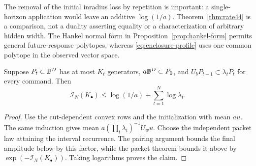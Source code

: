 The removal of the initial inradius loss by repetition is important:
a single-horizon application would leave an additive $\log(1/a)$.
Theorem~\ref{thm:rate44} is a comparison, not a duality asserting equality
or a characterization of arbitrary hidden width. The Hankel normal
form in Proposition~\ref{prop:hankel-form} permits general future-response
polytopes, whereas \eqref{eq:enclosure-profile} uses one common polytope
in the observed vector space.

\begin{corollary}\label{cor:chain44}
Suppose $P_t\subset\mathbb B^D$ has at most $K_t$ generators,
$a\mathbb B^D\subset P_0$, and $U_bP_{t-1}\subset\lambda_tP_t$ for every
command. Then
\[
 \mathcal I_N(K_\bullet)\le\log(1/a)+\sum_{t=1}^N\log\lambda_t.
\]
\end{corollary}
\begin{proof}
Use the cut-dependent convex rows and the initialization with mean $au$.
The same induction gives mean $a(\prod_t\lambda_t)^{-1}U_wu$.
Choose the independent packet law attaining the interval recurrence.
The pairing argument bounds the final amplitude below by this factor,
while the packet theorem bounds it above by
$\exp(-\mathcal I_N(K_\bullet))$. Taking logarithms proves the claim.
\end{proof}
